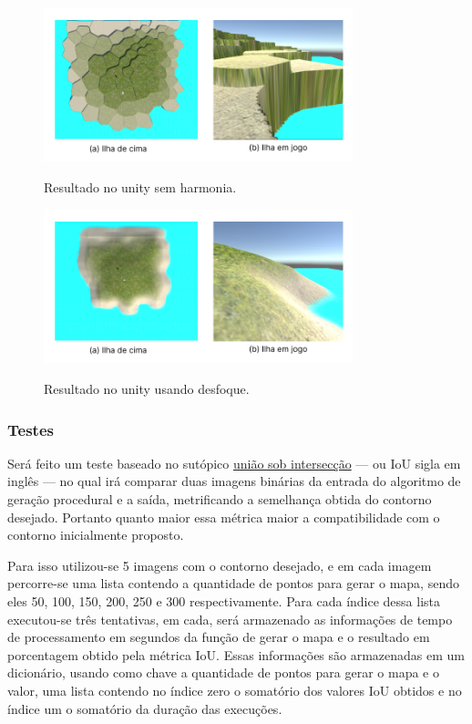 \begin{figure}[!ht]
	\centering
    \caption{Resultado no unity sem harmonia.}
	\includegraphics[width=0.8\textwidth]{figures/unity_entry.png}
	\label{fig:unity_init}
\end{figure}



\begin{figure}[!ht]
	\centering
    \caption{Resultado no unity usando desfoque.}
	\includegraphics[width=0.8\textwidth]{figures/unity_blur.png}
	\label{fig:unity_blur}
\end{figure}


\subsubsection{Testes}

Será feito um teste baseado no sutópico \hyperref[sec:uniaoSobInterseccao]{união sob intersecção} — ou IoU sigla em inglês — no qual irá comparar duas imagens binárias da entrada do algoritmo de geração procedural e a saída, metrificando a semelhança obtida do contorno desejado. Portanto quanto maior essa métrica maior a compatibilidade com o contorno inicialmente proposto.

Para isso utilizou-se 5 imagens com o contorno desejado, e em cada imagem percorre-se uma lista contendo a quantidade de pontos para gerar o mapa, sendo eles 50, 100, 150, 200, 250 e 300 respectivamente. Para cada índice dessa lista executou-se três tentativas, em cada, será armazenado as informações de tempo de processamento em segundos da função de gerar o mapa e o resultado em porcentagem obtido pela métrica IoU. Essas informações são armazenadas em um dicionário, usando como chave a quantidade de pontos para gerar o mapa e o valor, uma lista contendo no índice zero o somatório dos valores IoU obtidos e no índice um o somatório da duração das execuções.

